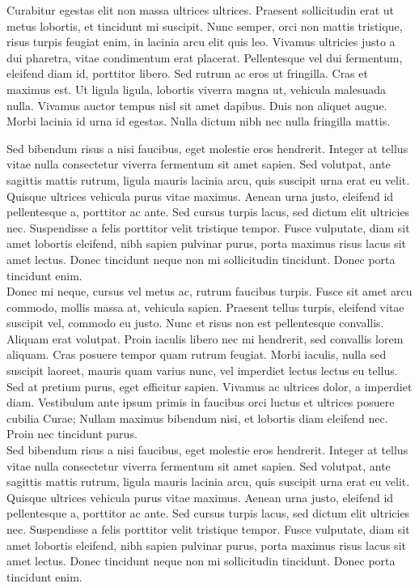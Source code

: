 Curabitur egestas elit non massa ultrices ultrices. Praesent sollicitudin erat ut metus lobortis, et tincidunt mi suscipit. Nunc semper, orci non mattis tristique, risus turpis feugiat enim, in lacinia arcu elit quis leo. Vivamus ultricies justo a dui pharetra, vitae condimentum erat placerat. Pellentesque vel dui fermentum, eleifend diam id, porttitor libero. Sed rutrum ac eros ut fringilla. Cras et maximus est. Ut ligula ligula, lobortis viverra magna ut, vehicula malesuada nulla. Vivamus auctor tempus nisl sit amet dapibus. Duis non aliquet augue. Morbi lacinia id urna id egestas. Nulla dictum nibh nec nulla fringilla mattis.

Sed bibendum risus a nisi faucibus, eget molestie eros hendrerit. Integer at tellus vitae nulla consectetur viverra fermentum sit amet sapien. Sed volutpat, ante sagittis mattis rutrum, ligula mauris lacinia arcu, quis suscipit urna erat eu velit. Quisque ultrices vehicula purus vitae maximus. Aenean urna justo, eleifend id pellentesque a, porttitor ac ante. Sed cursus turpis lacus, sed dictum elit ultricies nec. Suspendisse a felis porttitor velit tristique tempor. Fusce vulputate, diam sit amet lobortis eleifend, nibh sapien pulvinar purus, porta maximus risus lacus sit amet lectus. Donec tincidunt neque non mi sollicitudin tincidunt. Donec porta tincidunt enim.
\\

Donec mi neque, cursus vel metus ac, rutrum faucibus turpis. Fusce sit amet arcu commodo, mollis massa at, vehicula sapien. Praesent tellus turpis, eleifend vitae suscipit vel, commodo eu justo. Nunc et risus non est pellentesque convallis. Aliquam erat volutpat. Proin iaculis libero nec mi hendrerit, sed convallis lorem aliquam. Cras posuere tempor quam rutrum feugiat. Morbi iaculis, nulla sed suscipit laoreet, mauris quam varius nunc, vel imperdiet lectus lectus eu tellus. Sed at pretium purus, eget efficitur sapien. Vivamus ac ultrices dolor, a imperdiet diam. Vestibulum ante ipsum primis in faucibus orci luctus et ultrices posuere cubilia Curae; Nullam maximus bibendum nisi, et lobortis diam eleifend nec. Proin nec tincidunt purus. 
\\


Sed bibendum risus a nisi faucibus, eget molestie eros hendrerit. Integer at tellus vitae nulla consectetur viverra fermentum sit amet sapien. Sed volutpat, ante sagittis mattis rutrum, ligula mauris lacinia arcu, quis suscipit urna erat eu velit. Quisque ultrices vehicula purus vitae maximus. Aenean urna justo, eleifend id pellentesque a, porttitor ac ante. Sed cursus turpis lacus, sed dictum elit ultricies nec. Suspendisse a felis porttitor velit tristique tempor. Fusce vulputate, diam sit amet lobortis eleifend, nibh sapien pulvinar purus, porta maximus risus lacus sit amet lectus. Donec tincidunt neque non mi sollicitudin tincidunt. Donec porta tincidunt enim.
\\

